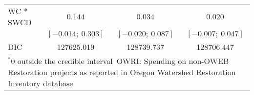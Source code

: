 \begin{table}
\begin{center}
\begin{tabular}{l c c c }
WC * SWCD        & $0.144$             & $0.034$             & $0.020$             \\
                 & $[-0.014;\ 0.303]$  & $[-0.020;\ 0.087]$  & $[-0.007;\ 0.047]$  \\
\hline
DIC              & 127625.019          & 128739.737          & 128706.447          \\
\hline
\multicolumn{4}{l}{\scriptsize{$^* 0$ outside the credible interval\
       OWRI: Spending on non-OWEB Restoration projects as reported in Oregon Watershed Restoration Inventory database}}
\end{tabular}
\label{table:basemods}
\end{center}
\end{table}
